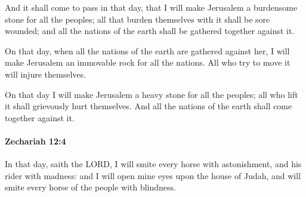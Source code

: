 			\begin{versebox}
					\item[BHS] 
					\item[LXX] 
					\item[ASV] And it shall come to pass in that day, that I will make Jerusalem a burdensome stone for all the peoples; all that burden themselves with it shall be sore wounded; and all the nations of the earth shall be gathered together against it.
					\item[NIV] On that day, when all the nations of the earth are gathered against her, I will make Jerusalem an immovable rock for all the nations. All who try to move it will injure themselves.
					\item[NRSV] On that day I will make Jerusalem a heavy stone for all the peoples; all who lift it shall grievously hurt themselves. And all the nations of the earth shall come together against it.
			\end{versebox}

		\paragraph{Zechariah 12:4} %
			\label{ZECHARIAH-12-4}

			In that day, saith the LORD, I will smite every horse with astonishment, and his rider with madness: and I will open mine eyes upon the house of Judah, and will smite every horse of the people with blindness.

